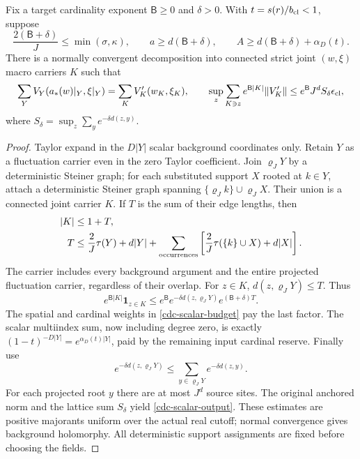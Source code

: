 \begin{lemma}
\label{cdc-scalar-lemma}
Fix a target cardinality exponent $\mathsf B\geq0$ and
$\delta>0$. With $t=s(r)/b_{\rm cl}<1$, suppose
\begin{equation}
 \frac{2(\mathsf B+\delta)}J\leq\min(\sigma,\kappa),\qquad
 a\geq d(\mathsf B+\delta),\qquad
 A\geq d(\mathsf B+\delta)+\alpha_D(t).
 \label{cdc-scalar-budget}
\end{equation}
There is a normally convergent decomposition into connected
strict joint $(w,\xi)$ macro carriers $K$ such that
\begin{equation}
 \sum_YV_Y(a_*(w)|_Y,\xi|_Y)=\sum_KV'_K(w_K,\xi_K),
 \qquad
 \sup_z\sum_{K\ni z}e^{\mathsf B|K|}
                         \|V'_K\|
 \leq e^{\mathsf B}J^d S_\delta\epsilon_{\rm cl},
 \label{cdc-scalar-output}
\end{equation}
where $S_\delta=\sup_z\sum_y e^{-\delta d(z,y)}$.
\end{lemma}
\begin{proof}
Taylor expand in the $D|Y|$ scalar background coordinates only.
Retain $Y$ as a fluctuation carrier even in the zero Taylor
coefficient. Join $\varrho_JY$ by a deterministic Steiner graph;
for each substituted support $X$ rooted at $k\in Y$, attach a
deterministic Steiner graph spanning
$\{\varrho_Jk\}\cup\varrho_JX$. Their union is a connected
joint carrier $K$. If $T$ is the sum of their edge lengths, then
\begin{align}
 |K|&\leq1+T,\nonumber\\
 T&\leq\frac2J\tau(Y)+d|Y|
       +\sum_{\rm occurrences}
          \left[\frac2J\tau(\{k\}\cup X)+d|X|\right].
 \label{cdc-joint-tree}
\end{align}
The carrier includes every background argument and the entire
projected fluctuation carrier, regardless of their overlap.
For $z\in K$, $d(z,\varrho_JY)\leq T$. Thus
\begin{equation}
 e^{\mathsf B|K|}\mathbf1_{z\in K}
 \leq e^{\mathsf B}e^{-\delta d(z,\varrho_JY)}
                                      e^{(\mathsf B+\delta)T}.
 \label{cdc-reroot}
\end{equation}
The spatial and cardinal weights in
\eqref{cdc-scalar-budget} pay the last factor. The scalar
multiindex sum, now including degree zero, is exactly
$(1-t)^{-D|Y|}=e^{\alpha_D(t)|Y|}$, paid by the remaining
input cardinal reserve. Finally use
\begin{equation}
 e^{-\delta d(z,\varrho_JY)}
 \leq\sum_{y\in\varrho_JY}e^{-\delta d(z,y)}.
 \label{cdc-anchor-sum}
\end{equation}
For each projected root $y$ there are at most $J^d$ source
sites. The original anchored norm and the lattice sum
$S_\delta$ yield \eqref{cdc-scalar-output}. These estimates
are positive majorants uniform over the actual real cutoff;
normal convergence gives background holomorphy. All deterministic
support assignments are fixed before choosing the fields.
\end{proof}

